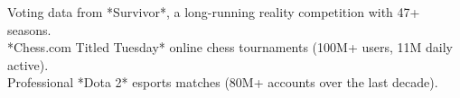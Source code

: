 \documentclass[preview]{standalone}
\begin{document}
Voting data from *Survivor*, a long-running reality competition with 47+ seasons.\\*Chess.com Titled Tuesday* online chess tournaments (100M+ users, 11M daily active).\\Professional *Dota 2* esports matches (80M+ accounts over the last decade).\\
\end{document}
